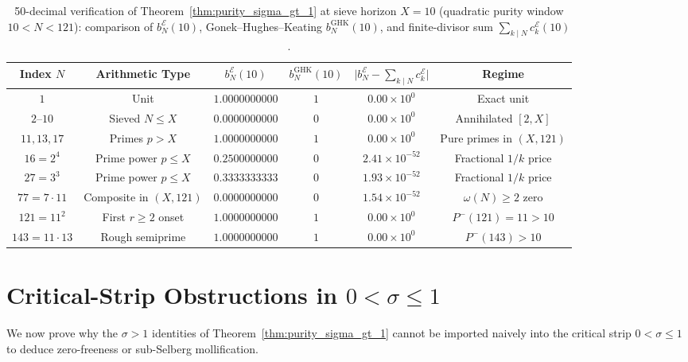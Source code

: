 \documentclass[11pt,reqno]{amsart}
\theoremstyle{definition}
\theoremstyle{remark}
\numberwithin{equation}{section}
\begin{document}
\begin{table}[t]
\centering
\caption{50-decimal verification of Theorem~\ref{thm:purity_sigma_gt_1} at sieve horizon $X = 10$ (quadratic purity window $10 < N < 121$): comparison of $b_N^{\mathcal{E}}(10)$, Gonek--Hughes--Keating $b_N^{\mathrm{GHK}}(10)$, and finite-divisor sum $\sum_{k \mid N} c_k^{\mathcal{E}}(10)$.}\label{tab:purity_ghk}
\footnotesize
\setlength{\tabcolsep}{5.0pt}
\begin{tabular}{@{}cccccc@{}}
\toprule
Index $N$ & Arithmetic Type & $b_N^{\mathcal{E}}(10)$ & $b_N^{\mathrm{GHK}}(10)$ & $\lvert b_N^{\mathcal{E}} - \sum_{k \mid N} c_k^{\mathcal{E}}\rvert$ & Regime \\
\midrule
$1$   & Unit               & $1.0000000000$ & $1$ & $0.00 \times 10^{0}$  & Exact unit \\
$2\text{--}10$ & Sieved $N \le X$ & $0.0000000000$ & $0$ & $0.00 \times 10^{0}$  & Annihilated $[2, X]$ \\
$11, 13, 17$ & Primes $p > X$  & $1.0000000000$ & $1$ & $0.00 \times 10^{0}$  & Pure primes in $(X, 121)$ \\
$16 = 2^4$   & Prime power $p \le X$ & $0.2500000000$ & $0$ & $2.41 \times 10^{-52}$ & Fractional $1/k$ price \\
$27 = 3^3$   & Prime power $p \le X$ & $0.3333333333$ & $0$ & $1.93 \times 10^{-52}$ & Fractional $1/k$ price \\
$77 = 7 \cdot 11$ & Composite in $(X, 121)$ & $0.0000000000$ & $0$ & $1.54 \times 10^{-52}$ & $\omega(N) \ge 2$ zero \\
$121 = 11^2$ & First $r \ge 2$ onset & $1.0000000000$ & $1$ & $0.00 \times 10^{0}$  & $P^-(121) = 11 > 10$ \\
$143 = 11 \cdot 13$ & Rough semiprime & $1.0000000000$ & $1$ & $0.00 \times 10^{0}$  & $P^-(143) > 10$ \\
\bottomrule
\end{tabular}
\end{table}

\section{Critical-Strip Obstructions in $0 < \sigma \le 1$}\label{sec:obstructions}

We now prove why the $\sigma > 1$ identities of Theorem~\ref{thm:purity_sigma_gt_1} cannot be imported naively into the critical strip $0 < \sigma \le 1$ to deduce zero-freeness or sub-Selberg mollification.
\end{document}
